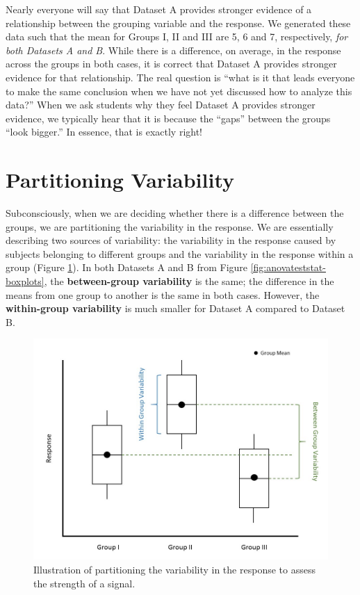 \documentclass[]{book}
\theoremstyle{plain}
\theoremstyle{mydefn}
\theoremstyle{myexmpl}
\theoremstyle{remark}
\begin{document}
Nearly everyone will say that Dataset A provides stronger evidence of a
relationship between the grouping variable and the response. We
generated these data such that the mean for Groups I, II and III are 5,
6 and 7, respectively, \emph{for both Datasets A and B}. While there is
a difference, on average, in the response across the groups in both
cases, it is correct that Dataset A provides stronger evidence for that
relationship. The real question is ``what is it that leads everyone to
make the same conclusion when we have not yet discussed how to analyze
this data?'' When we ask students why they feel Dataset A provides
stronger evidence, we typically hear that it is because the ``gaps''
between the groups ``look bigger.'' In essence, that is exactly right!

\section{Partitioning Variability}\label{partitioning-variability-1}

Subconsciously, when we are deciding whether there is a difference
between the groups, we are partitioning the variability in the response.
We are essentially describing two sources of variability: the
variability in the response caused by subjects belonging to different
groups and the variability in the response within a group (Figure
\ref{fig:anovateststat-partition-variability}). In both Datasets A and B
from Figure \ref{fig:anovateststat-boxplots}, the \textbf{between-group
variability} is the same; the difference in the means from one group to
another is the same in both cases. However, the \textbf{within-group
variability} is much smaller for Dataset A compared to Dataset B.

\begin{figure}

{\centering \includegraphics[width=0.8\linewidth]{./images/ANOVATestStat-Partition-Variability} 

}

\caption{Illustration of partitioning the variability in the response to assess the strength of a signal.}\label{fig:anovateststat-partition-variability}
\end{figure}
\end{document}
